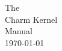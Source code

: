 \documentclass[11pt,fullpage]{article}
\begin{document}
\begin{titlepage}
\vspace*{2in}
\Huge
\begin{center}
The \\
Charm Kernel \\
Manual\\
\vspace*{0.7in}
\today
\end{center}
\normalsize
\end{titlepage}



\tableofcontents
\end{document}
